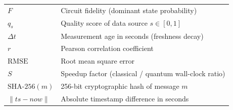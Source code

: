 \documentclass[12pt,a4paper]{article}
\begin{document}
\begin{table}[H]
\begin{tabularx}{\textwidth}{@{}lX@{}}
$F$                      & Circuit fidelity (dominant state probability) \\
$q_s$                    & Quality score of data source $s \in [0, 1]$ \\
$\Delta t$               & Measurement age in seconds (freshness decay) \\
$r$                      & Pearson correlation coefficient \\
$\text{RMSE}$            & Root mean square error \\
$S$                      & Speedup factor (classical / quantum wall-clock ratio) \\
$\text{SHA-256}(m)$      & 256-bit cryptographic hash of message $m$ \\
$\|ts - now\|$           & Absolute timestamp difference in seconds \\
\bottomrule
\end{tabularx}
\end{table}

\clearpage
\end{document}

